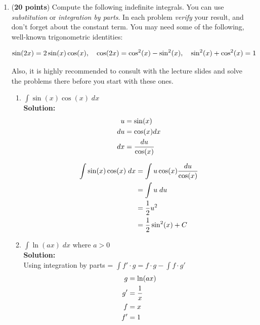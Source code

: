 \documentclass[a4paper]{article}
\begin{document}
\begin{enumerate}


\item (\textbf{20 points}) Compute the following indefinite integrals. You can use \textit{substitution} or \textit{integration by parts}. In each problem \textit{verify} your result, and don't forget about the constant term. You may need some of the following, well-known trigonometric identities:

\begin{align}
	\sin(2x) = 2\sin(x)\cos(x), \quad \cos(2x) = \cos^2(x) - \sin^2(x), \quad \sin^2(x) + \cos^2(x) = 1\notag
\end{align}

Also, it is highly recommended to consult with the lecture slides and solve the problems there before you start with these ones.

\begin{enumerate}
	\item $\int \sin(x) \cos(x) \; dx$\\
	\textbf{Solution:}\\
	
\begin{align}
	u &= \sin(x)\notag\\
	du &= \cos(x) dx\notag\\
	dx &= \frac{du}{\cos(x)}\notag
\end{align}	
	
	
\begin{align}
	\int \sin(x) \cos(x) \; dx &= \int u \cos(x) \frac{du}{\cos(x)}\notag\\
	&= \int u \; du\notag\\
	&= \frac{1}{2}u^2\notag\\
	&= \frac{1}{2} \sin^2(x) + C\notag
\end{align}	
	
	
	\item $\int \ln(ax) \; dx$ where $a > 0$\\
	\textbf{Solution:}\\
	
Using integration by parts = $\int f' \cdot g = f \cdot g - \int f \cdot g'$\\	
	
	
\begin{align}
	g &= \ln(ax)\notag\\
	g' &= \frac{1}{x}\notag\\
	f &= x\notag\\
	f' &= 1\notag
\end{align}	
	

\end{enumerate}
\end{enumerate}
\end{document}
